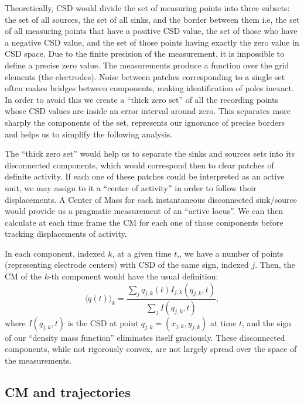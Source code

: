 \documentclass[11pt, letterpaper]{article}
\begin{document}
Theoretically, CSD would divide the set of measuring points into three subsets: the set of all sources, the set of all sinks, and the border between them i.e, the set of all measuring points that have a positive CSD  value, the set of those who have a negative CSD value, and the set of those points having exactly the zero value in CSD space.
Due to the finite precision of the measurement,
it is impossible to define a precise zero value.
The measurements produce a function over the grid elements (the electrodes).
Noise between patches corresponding to a single set often makes bridges
between components, making identification of poles inexact.
In order to avoid this we create a ``thick zero set'' of all the recording
points whose CSD values are inside an error interval around zero.
This separates more sharply the components of the set,
represents our ignorance of precise borders and helps
us to simplify the following analysis.

The ``thick zero set'' would help us to separate the sinks and sources sets into
its disconnected components, which would correspond then to clear patches of
definite activity. If each one of these patches could be
interpreted as an active unit,
we may assign to it a ``center of activity'' in order to follow their displacements.
A Center of Mass for each instantaneous disconnected sink/source would provide us
a pragmatic measurement of an ``active locus''. We can then calculate at each time
frame the CM for each one of those components before tracking displacements of activity.


In each component, indexed $k$, at a given time $t$,, we have a number of points
(representing electrode centers)
with CSD of the same sign, indexed $j$. Then, the CM of the $k$-th
component would have the usual definition:
\begin{equation}\label{cmparadisj}
   \langle q(t) \rangle_k =\frac{\sum_j q_{j,k} (t) I_{j,k} (q_{j,k},t)}
           {\sum_j I(q_{j,k},t)},
\end{equation}
where $I(q_{j,k},t)$ is the CSD at point $q_{j,k}=(x_{j,k}, y_{j,k})$ at time $t$,
and the
sign of our ``density mass function'' eliminates itself graciously.
These disconnected components, while not rigorously convex,
are not largely spread over the space of the measurements.



\subsection{CM and trajectories}
\end{document}

